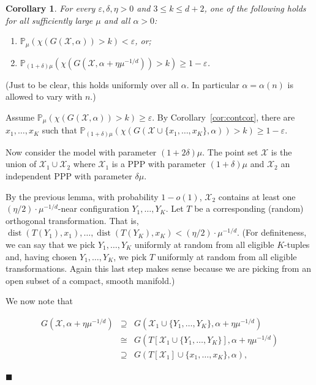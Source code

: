 \documentclass[11pt]{article}%
\newenvironment{proof}{\vspace{1ex}\noindent{\bf Proof.}}{\hspace*{\fill}$\blacksquare$\vspace{1ex}}
\newtheorem{corollary}[corollary]{Corollary}
\newcommand{\Xcal}[0]{\ensuremath{{\mathcal X}}}
\newcommand{\Pee}[0]{\ensuremath{{\mathbb P}}}
\newcommand{\eps}{\varepsilon}
\DeclareMathOperator{\dist}{dist}
\begin{document}
\begin{corollary}\label{cor:etacor}
For every $\eps,\delta,\eta > 0$ and $3\leq k \leq d+2$, one of the following holds for all sufficiently 
large $\mu$ and all $\alpha>0$:
\begin{enumerate}
 \item $\Pee_\mu( \chi( G(\Xcal,\alpha)) > k ) < \eps$, or;
 \item $\Pee_{(1+\delta)\mu}( \chi( G(\Xcal,\alpha+\eta\mu^{-1/d})) > k ) \geq 1-\eps$.
\end{enumerate}
\end{corollary}

\noindent
(Just to be clear, this holds uniformly over all $\alpha$. In particular 
$\alpha = \alpha(n)$ is allowed to vary with $n$.)


\begin{proof}
Assume $\Pee_\mu( \chi( G(\Xcal,\alpha)) > k ) \geq \eps$.
By Corollary~\ref{cor:contcor}, 
there are $x_1,\dots,x_K$ such that 
$\Pee_{(1+\delta)\mu}( \chi( G(\Xcal \cup \{x_1,\dots,x_K\},\alpha)) > k ) \geq 1-\eps$.

Now consider the model with parameter $(1+2\delta)\mu$.
The point set $\Xcal$ is the union of $\Xcal_1 \cup \Xcal_2$
where $\Xcal_1$ is a PPP with parameter $(1+\delta)\mu$ and $\Xcal_2$ 
an independent PPP with parameter $\delta\mu$.

By the previous lemma, with probability $1-o(1)$, $\Xcal_2$ contains 
at least one $(\eta/2)\cdot\mu^{-1/d}$-near configuration $Y_1,\dots,Y_K$.
Let $T$ be a corresponding (random) orthogonal transformation. That is, 
$\dist( T(Y_1), x_1 ), \dots, \dist( T(Y_K), x_K ) < (\eta/2)\cdot\mu^{-1/d}$. 
(For definiteness, we can say that we pick $Y_1,\dots,Y_K$ 
uniformly at random from all eligible $K$-tuples and, having chosen 
$Y_1,\dots,Y_K$, we pick $T$ 
uniformly at random from all eligible transformations. Again
this last step makes sense because we are picking from an
open subset of a compact, smooth manifold.)

We now note that 

$$ \begin{array}{rcl} G( \Xcal, \alpha+\eta\mu^{-1/d} ) & \supseteq & 
G( \Xcal_1 \cup \{Y_1,\dots,Y_K\}, \alpha+\eta\mu^{-1/d} ) \\
& \cong & G( T\left[\Xcal_1 \cup \{Y_1,\dots,Y_K\}\right], \alpha+\eta\mu^{-1/d} ) \\
& \supseteq &  G( T\left[\Xcal_1\right] \cup \{x_1,\dots,x_K\}, \alpha ), 
\end{array} $$


\end{proof}
\end{document}
